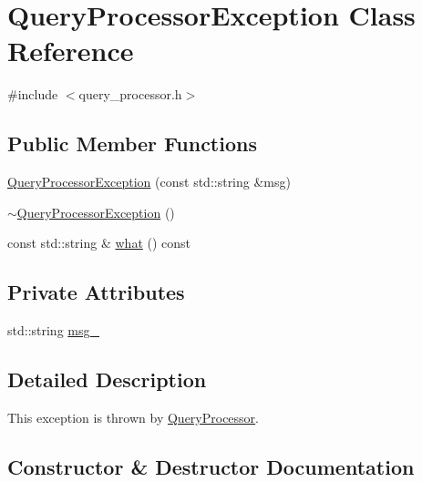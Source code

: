 \hypertarget{classQueryProcessorException}{}\section{Query\+Processor\+Exception Class Reference}
\label{classQueryProcessorException}


{\ttfamily \#include $<$query\+\_\+processor.\+h$>$}

\subsection*{Public Member Functions}
\begin{DoxyCompactItemize}
\item 
\hyperlink{classQueryProcessorException_a2ce86b4809cf518c907f8702ab29ff0c}{Query\+Processor\+Exception} (const std\+::string \&msg)
\item 
\hyperlink{classQueryProcessorException_a0c67a60270ce55d8f3e0912e0f0ad63b}{$\sim$\+Query\+Processor\+Exception} ()
\item 
const std\+::string \& \hyperlink{classQueryProcessorException_abe4c62e8527ee9ddfaff8000b9ba4f18}{what} () const 
\end{DoxyCompactItemize}
\subsection*{Private Attributes}
\begin{DoxyCompactItemize}
\item 
std\+::string \hyperlink{classQueryProcessorException_a11ad5e07a10783cc3d4c8b1376162d7d}{msg\+\_\+}
\end{DoxyCompactItemize}


\subsection{Detailed Description}
This exception is thrown by \hyperlink{classQueryProcessor}{Query\+Processor}. 

\subsection{Constructor \& Destructor Documentation}
\hypertarget{classQueryProcessorException_a2ce86b4809cf518c907f8702ab29ff0c}{}
